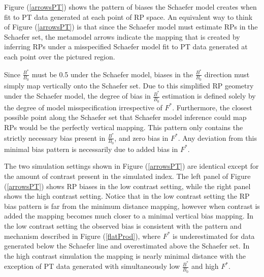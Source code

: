 %
Figure (\ref{arrowsPT}) shows the pattern of biases the Schaefer model creates when fit
to PT data generated at each point of RP space. An equivalent way to think of Figure
(\ref{arrowsPT}) is that since the Schaefer model must estimate RPs in the Schaefer set,
the metamodel arrows indicate the mapping that is created by inferring RPs under
a misspecified Schaefer model fit to PT data generated at each point over the pictured
region.

%
Since $\frac{B^*}{B_0}$ must be 0.5 under the Schaefer model, biases in the
$\frac{B^*}{B_0}$ direction must simply map vertically onto the Schaefer set.
Due to this simplified RP geometry under the Schaefer model, the degree of bias in
$\frac{B^*}{B_0}$ estimation is defined solely by the degree of model
misspecification irrespective of $F^*$. Furthermore,
the closest possible point along the Schaefer set that Schaefer model inference %
could map RPs would be the perfectly vertical mapping. This pattern only contains the
strictly necessary bias present in $\frac{B^*}{B_0}$, and zero bias in $F^*$.
Any deviation from this minimal bias pattern is necessarily due to added bias in $F^*$.

%
The two simulation settings shown in Figure (\ref{arrowsPT}) are identical except
for the amount of contrast present in the simulated index. The left panel of
Figure (\ref{arrowsPT}) shows RP biases in the low contrast setting, while the
right panel shows the high contrast setting. Notice that in the low contrast
setting the RP bias pattern is far from the minimum distance mapping, however when
contrast is added the mapping becomes much closer to a minimal vertical bias mapping.
In the low contrast setting the observed bias is consistent with the pattern
and mechanism described in Figure (\ref{flatProd}), where $F^*$ is underestimated
for data generated below the Schaefer line and overestimated above the Schaefer set.
In the high contrast simulation the mapping is nearly minimal distance with the exception
of PT data generated with simultaneously low $\frac{B^*}{B_0}$ and high $F^*$.


